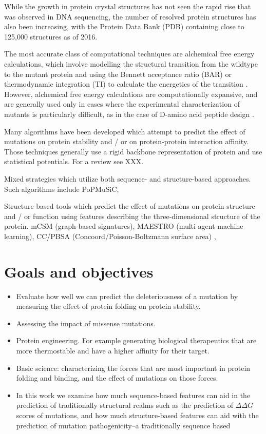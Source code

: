 While the growth in protein crystal structures has not seen the rapid rise that was observed in DNA sequencing, the number of resolved protein structures has also been increasing, with the Protein Data Bank (PDB) containing close to 125,000 structures as of 2016.

The most accurate class of computational techniques are alchemical free energy calculations, which involve modelling the structural transition from the wildtype to the mutant protein and using the Bennett acceptance ratio (BAR) or thermodynamic integration (TI) to calculate the energetics of the transition \cite{monticelli_introduction_2013}. However, alchemical free energy calculations are computationally expansive, and are generally used only in cases where the experimental characterization of mutants is particularly difficult, as in the case of D-amino acid peptide design \cite{welch_potent_2007}.

Many algorithms have been developed which attempt to predict the effect of mutations on protein stability and / or on protein-protein interaction affinity. Those techniques generally use a rigid backbone representation of protein and use statistical potentials. For a review see XXX.

Mixed strategies which utilize both sequence- and structure-based approaches. Such algorithms include PoPMuSiC,

Structure-based tools which predict the effect of mutations on protein structure and / or function using features describing the three-dimensional structure of the protein. mCSM \cite{pires_mcsm:_2014} (graph-based signatures), MAESTRO \cite{laimer_maestro_2015} (multi-agent machine learning), CC/PBSA (Concoord/Poisson-Boltzmann surface area) \cite{benedix_predicting_2009},



\section{Goals and objectives}

\begin{itemize}
    \item Evaluate how well we can predict the deleteriousness of a mutation by measuring the effect of protein folding on protein stability.
    \item Assessing the impact of missense mutations.
    \item Protein engineering. For example generating biological therapeutics that are more thermostable and have a higher affinity for their target.
    \item Basic science: characterizing the forces that are most important in protein folding and binding, and the effect of mutations on those forces.
    \item In this work we examine how much sequence-based features can aid in the prediction of traditionally structural realms such as the prediction of $\Delta \Delta G$ scores of mutations, and how much structure-based features can aid with the prediction of mutation pathogenicity--a traditionally sequence based
\end{itemize}



